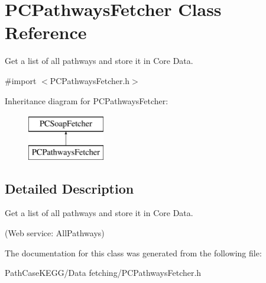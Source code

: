 \hypertarget{interface_p_c_pathways_fetcher}{
\section{PCPathwaysFetcher Class Reference}
\label{interface_p_c_pathways_fetcher}
}


Get a list of all pathways and store it in Core Data.  




{\ttfamily \#import $<$PCPathwaysFetcher.h$>$}

Inheritance diagram for PCPathwaysFetcher:\begin{figure}[h!]
\begin{center}
\leavevmode
\includegraphics[height=2.000000cm]{kegg_doc/interface_p_c_pathways_fetcher}
\end{center}
\end{figure}


\subsection{Detailed Description}
Get a list of all pathways and store it in Core Data. 

(Web service: {\ttfamily AllPathways}) 

The documentation for this class was generated from the following file:\begin{DoxyCompactItemize}
\item 
PathCaseKEGG/Data fetching/PCPathwaysFetcher.h\end{DoxyCompactItemize}
